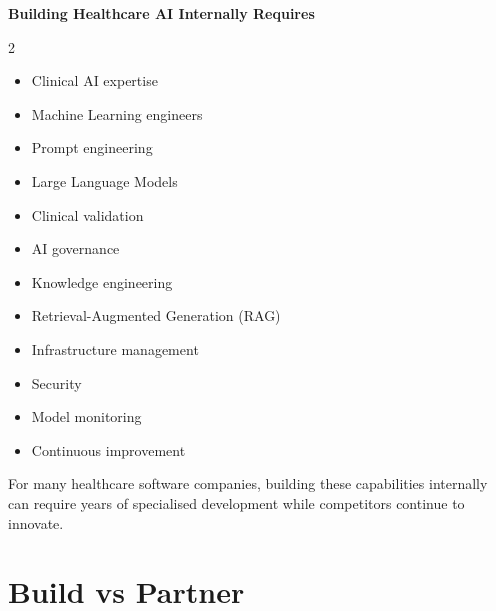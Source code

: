 \begin{partnerbox}

\textbf{Building Healthcare AI Internally Requires}

\vspace{3mm}

\begin{multicols}{2}

\begin{itemize}

\item Clinical AI expertise

\item Machine Learning engineers

\item Prompt engineering

\item Large Language Models

\item Clinical validation

\item AI governance

\item Knowledge engineering

\item Retrieval-Augmented Generation (RAG)

\item Infrastructure management

\item Security

\item Model monitoring

\item Continuous improvement

\end{itemize}

\end{multicols}

\end{partnerbox}

\vspace{4mm}

For many healthcare software companies, building these capabilities internally can require years of specialised development while competitors continue to innovate.


\section{Build vs Partner}

